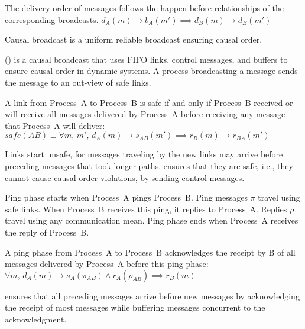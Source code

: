 \begin{definition}
  The delivery order of messages follows the happen before relationships of the
  corresponding broadcasts.
  $d_A(m) \rightarrow b_A(m') \implies d_B(m) \rightarrow d_B(m')$
\end{definition}

\begin{definition}
  Causal broadcast is a uniform reliable broadcast ensuring causal order.
\end{definition}

\PCBROADCAST (\REF) is a causal broadcast that uses FIFO links, control
messages, and buffers to ensure causal order in dynamic systems. A process
broadcasting a message sends the message to an out-view of safe links.

\begin{definition} 
  A link from Process~A to Process~B is safe if and only if Process~B received
  or will receive all messages delivered by Process~A before receiving any
  message that Process~A will
  deliver: $safe(AB) \equiv \forall m,\, m',\, d_A(m) \rightarrow s_{AB}(m')
  \implies r_B(m) \rightarrow r_{BA}(m')$
\end{definition}

Links start unsafe, for messages traveling by the new links may arrive before
preceding messages that took longer paths. \PCBROADCAST ensures that they are
safe, i.e., they cannot cause causal order violations, by sending control
messages.

\begin{definition}
  Ping phase starts when Process~A pings Process~B. Ping messages $\pi$ travel
  using safe links. When Process~B receives this ping, it replies to
  Process~A. Replies $\rho$ travel using any communication mean. Ping phase ends
  when Process~A receives the reply of Process~B.
\end{definition}

\begin{lemma}
  A ping phase from Process~A to Process~B acknowledges the receipt by B of all
  messages delivered by Process~A before this ping phase:
  $\forall m,\, d_A(m) \rightarrow s_A(\pi_{AB}) \wedge r_A(\rho_{AB}) \implies
  r_B(m)$
\end{lemma}

\PCBROADCAST ensures that all preceding messages arrive before new messages by
acknowledging the receipt of most messages while buffering messages concurrent
to the acknowledgment.



